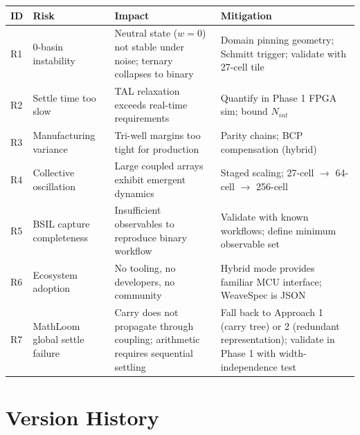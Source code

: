 \documentclass[11pt, a4paper]{report}
\begin{document}
\begin{longtable}{@{}p{1cm}p{3.5cm}p{5cm}p{4cm}@{}}
\toprule
\textbf{ID} & \textbf{Risk} & \textbf{Impact} & \textbf{Mitigation} \\
\midrule
\endhead
R1 & 0-basin instability & Neutral state ($w=0$) not stable under noise;
      ternary collapses to binary & Domain pinning geometry;
      Schmitt trigger; validate with 27-cell tile \\
R2 & Settle time too slow & TAL relaxation exceeds real-time requirements &
     Quantify in Phase 1 FPGA sim; bound $N_{int}$ \\
R3 & Manufacturing variance & Tri-well margins too tight for
     production & Parity chains; BCP compensation (hybrid) \\
R4 & Collective oscillation & Large coupled arrays exhibit emergent
     dynamics & Staged scaling; 27-cell $\to$ 64-cell $\to$ 256-cell \\
R5 & BSIL capture completeness & Insufficient observables to reproduce
     binary workflow & Validate with known workflows; define minimum
     observable set \\
R6 & Ecosystem adoption & No tooling, no developers, no community &
     Hybrid mode provides familiar MCU interface; WeaveSpec is JSON \\
R7 & MathLoom global settle failure & Carry does not propagate through
     coupling; arithmetic requires sequential settling &
     Fall back to Approach 1 (carry tree) or 2 (redundant representation);
     validate in Phase 1 with width-independence test \\
\bottomrule
\end{longtable}

\chapter{Version History}
\end{document}
